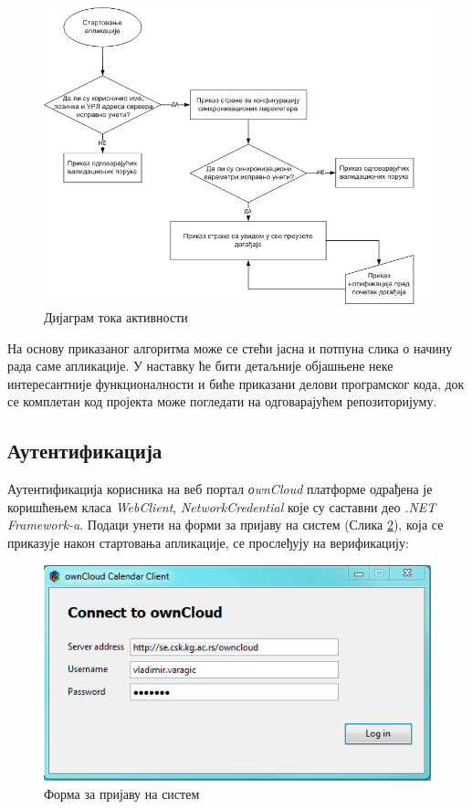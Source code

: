 \begin{figure}[H]
	\centering
	\includegraphics[scale=0.5]{slike/tok_aktivnosti.png}
	\caption{Дијаграм тока активности}
	\label{fig:application_alogorithm}
\end{figure}

На основу приказаног алгоритма  може се стећи јасна и потпуна слика о начину рада саме апликације. У наставку ће бити детаљније објашњене неке интересантније функционалности и биће приказани делови програмског кода, док се комплетан код пројекта може погледати на одговарајућем репозиторијуму\cite{svn_repo}.

\subsection{Аутентификација}

Аутентификација корисника на веб портал \textit{оwnCloud} платформе одрађена је коришћењем класа \textit{WebClient}, \textit{NetworkCredential} које су саставни део \textit{.NET Framework-a}.  Подаци унети на форми за пријаву на систем (Слика \ref{fig:login_form}), која се приказује након стартовања апликације, се прослеђују на верификацију:

\begin{figure}[H]
	\centering
	\includegraphics[scale=0.5]{slike/logInForm.png}
	\caption{Форма за пријаву на систем}
	\label{fig:login_form}
\end{figure}

